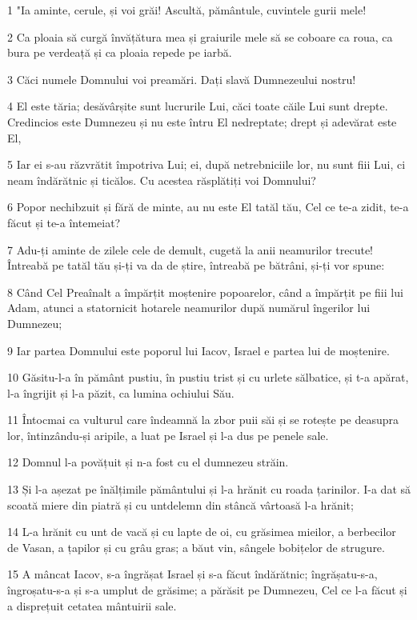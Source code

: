 \par 1 "Ia aminte, cerule, și voi grăi! Ascultă, pământule, cuvintele gurii mele!
\par 2 Ca ploaia să curgă învățătura mea și graiurile mele să se coboare ca roua, ca bura pe verdeață și ca ploaia repede pe iarbă.
\par 3 Căci numele Domnului voi preamări. Dați slavă Dumnezeului nostru!
\par 4 El este tăria; desăvârșite sunt lucrurile Lui, căci toate căile Lui sunt drepte. Credincios este Dumnezeu și nu este întru El nedreptate; drept și adevărat este El,
\par 5 Iar ei s-au răzvrătit împotriva Lui; ei, după netrebniciile lor, nu sunt fiii Lui, ci neam îndărătnic și ticălos. Cu acestea răsplătiți voi Domnului?
\par 6 Popor nechibzuit și fără de minte, au nu este El tatăl tău, Cel ce te-a zidit, te-a făcut și te-a întemeiat?
\par 7 Adu-ți aminte de zilele cele de demult, cugetă la anii neamurilor trecute! Întreabă pe tatăl tău și-ți va da de știre, întreabă pe bătrâni, și-ți vor spune:
\par 8 Când Cel Preaînalt a împărțit moștenire popoarelor, când a împărțit pe fiii lui Adam, atunci a statornicit hotarele neamurilor după numărul îngerilor lui Dumnezeu;
\par 9 Iar partea Domnului este poporul lui Iacov, Israel e partea lui de moștenire.
\par 10 Găsitu-l-a în pământ pustiu, în pustiu trist și cu urlete sălbatice, și t-a apărat, l-a îngrijit și l-a păzit, ca lumina ochiului Său.
\par 11 Întocmai ca vulturul care îndeamnă la zbor puii săi și se rotește pe deasupra lor, întinzându-și aripile, a luat pe Israel și l-a dus pe penele sale.
\par 12 Domnul l-a povățuit și n-a fost cu el dumnezeu străin.
\par 13 Și l-a așezat pe înălțimile pământului și l-a hrănit cu roada țarinilor. I-a dat să scoată miere din piatră și cu untdelemn din stâncă vârtoasă l-a hrănit;
\par 14 L-a hrănit cu unt de vacă și cu lapte de oi, cu grăsimea mieilor, a berbecilor de Vasan, a țapilor și cu grâu gras; a băut vin, sângele bobițelor de strugure.
\par 15 A mâncat Iacov, s-a îngrășat Israel și s-a făcut îndărătnic; îngrășatu-s-a, îngroșatu-s-a și s-a umplut de grăsime; a părăsit pe Dumnezeu, Cel ce l-a făcut și a disprețuit cetatea mântuirii sale.
